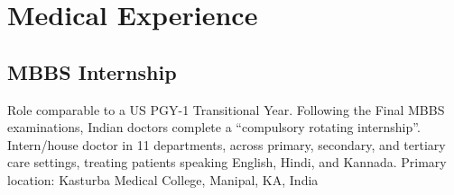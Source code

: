 \documentclass[10pt, letterpaper]{article}
\begin{document}
\section{Medical Experience}
\subsection{MBBS Internship}


\begin{minipage}[t]{1\textwidth}
  Role comparable to a US PGY-1 Transitional Year. Following the Final MBBS examinations, Indian doctors complete a “compulsory rotating internship”. Intern/house doctor in 11 departments, across primary, secondary, and tertiary care settings, treating patients speaking English, Hindi, and Kannada. Primary location: Kasturba Medical College, Manipal, KA, India
\end{minipage}
\\
\\
\end{document}
